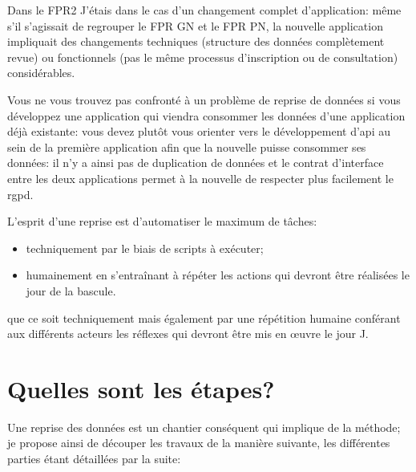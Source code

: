 \documentclass{book}
\begin{document}
\begin{bclogo}[arrondi = 0.1, couleur = blue!10, logo = \bcinfo]{Dans le FPR2}
J'étais dans le cas d'un changement complet d'application: même s'il s'agissait de regrouper le FPR GN et le FPR PN, la nouvelle application impliquait des changements techniques (structure des données complètement revue) ou fonctionnels (pas le même processus d'inscription ou de consultation) considérables.
\end{bclogo}

Vous ne vous trouvez pas confronté à un problème de reprise de données si vous développez une application qui viendra consommer les données d'une application déjà existante: vous devez plutôt vous orienter vers le développement d'\gls{api} au sein de la première application afin que la nouvelle puisse consommer ses données: il n'y a ainsi pas de duplication de données et le contrat d'interface entre les deux applications permet à la nouvelle de respecter plus facilement le \gls{rgpd}.

L'esprit d'une reprise est d'automatiser le maximum de tâches:
\begin{itemize}
\item techniquement par le biais de scripts à exécuter;
\item humainement en s'entraînant à répéter les actions qui devront être réalisées le jour de la bascule.
\end{itemize}

que ce soit techniquement mais également par une répétition humaine conférant aux différents acteurs les réflexes qui devront être mis en œuvre le jour J.

\section{Quelles sont les étapes?}

Une reprise des données est un chantier conséquent qui implique de la méthode; je propose ainsi de découper les travaux de la manière suivante, les différentes parties étant détaillées par la suite:
\end{document}

